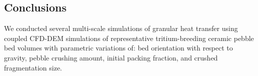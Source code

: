 

\subsection{Conclusions}
We conducted several multi-scale simulations of granular heat transfer using coupled CFD-DEM simulations of representative tritium-breeding ceramic pebble bed volumes with parametric variations of: bed orientation with respect to gravity, pebble crushing amount, initial packing fraction, and crushed fragmentation size.

